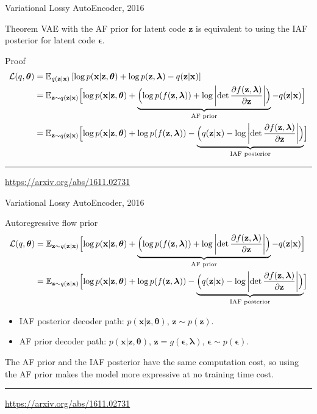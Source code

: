 \documentclass{beamer}
\newcommand{\bx}{\mathbf{x}}
\newcommand{\bz}{\mathbf{z}}
\newcommand{\bepsilon}{\boldsymbol{\epsilon}}
\newcommand{\blambda}{\boldsymbol{\lambda}}
\newcommand{\btheta}{\boldsymbol{\theta}}
\begin{document}
\begin{frame}{Variational Lossy AutoEncoder, 2016}
\begin{block}{Theorem}
VAE with the AF prior for latent code $\bz$ is equivalent to using the IAF posterior for latent code $\bepsilon$.
\end{block}
\begin{block}{Proof}
\vspace{-0.5cm}
{\footnotesize
\begin{align*}
\mathcal{L}(q, \btheta) &= \mathbb{E}_{q(\bz | \bx)} \left[ \log p(\bx | \bz, \btheta) +  \log p(\bz, \blambda) - q(\bz | \bx) \right] \\
&= \mathbb{E}_{\bz \sim q(\bz | \bx)} \Bigl[ \log p(\bx | \bz, \btheta) + \underbrace{ \Bigl( \log p(f(\bz, \blambda)) + \log \left| \det \frac{\partial f(\bz, \blambda)}{\partial \bz} \right| \Bigr) }_{\text{AF prior}} - q(\bz | \bx) \Bigr] \\
&= \mathbb{E}_{\bz \sim q(\bz | \bx)} \Bigl[ \log p(\bx | \bz, \btheta) +  \log p(f(\bz, \blambda)) - \underbrace{ \Bigl( q(\bz | \bx) - \log \left| \det \frac{\partial f(\bz, \blambda)}{\partial \bz} \right| \Bigr) }_{\text{IAF posterior}} \Bigr]
\end{align*}
}
\end{block}
\vfill
\hrule\medskip
{\scriptsize \href{https://arxiv.org/abs/1611.02731}{https://arxiv.org/abs/1611.02731}}
\end{frame}
\begin{frame}{Variational Lossy AutoEncoder, 2016}
	\begin{block}{Autoregressive flow prior}
		{\footnotesize
		\begin{align*}
			\mathcal{L}(q, \btheta) &= \mathbb{E}_{\bz \sim q(\bz | \bx)} \Bigl[ \log p(\bx | \bz, \btheta) + \underbrace{ \Bigl( \log p(f(\bz, \blambda)) + \log \left| \det \frac{\partial f(\bz, \blambda)}{\partial \bz} \right| \Bigr) }_{\text{AF prior}} - q(\bz | \bx) \Bigr] \\
			&= \mathbb{E}_{\bz \sim q(\bz | \bx)} \Bigl[ \log p(\bx | \bz, \btheta) +  \log p(f(\bz, \blambda)) - \underbrace{ \Bigl( q(\bz | \bx) - \log \left| \det \frac{\partial f(\bz, \blambda)}{\partial \bz} \right| \Bigr) }_{\text{IAF posterior}} \Bigr]
		\end{align*}
		}
	\end{block}
	\begin{itemize}
		\item IAF posterior decoder path: $p(\bx|\bz, \btheta)$, $\bz \sim p(\bz)$.
		\item AF prior decoder path: $p(\bx|\bz, \btheta)$, $\bz = g(\bepsilon, \blambda)$, $\bepsilon \sim p(\bepsilon)$. 
	\end{itemize}
	The AF prior and the IAF posterior have the same computation cost, so using the AF prior makes the model more expressive at no training time cost.
\vfill
\hrule\medskip
{\scriptsize \href{https://arxiv.org/abs/1611.02731}{https://arxiv.org/abs/1611.02731}}
\end{frame}
\end{document}
